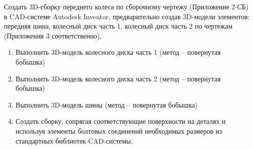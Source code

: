 
Создать 3D-сборку переднего колеса по сборочному чертежу (Приложение 2-СБ) в CAD-системе Autodesk Inventor, предварительно создав 3D-модели элементов: передняя шина, колесный диск часть 1, колесный диск часть 2 по чертежам (Приложения 3 соответственно).



\explaneSection

\begin{enumerate}
    \item Выполнить 3D-модель колесного диска часть 1 (метод – повернутая бобышка)
    \item Выполнить 3D-модель колесного диска часть 2 (метод – повернутая бобышка)
    \item Выполнить 3D-модель шины (метод – повернутая бобышка)
    \item Создать сборку, сопрягая соответствующие поверхности на деталях и используя элементы болтовых соединений необходимых размеров из стандартных библиотек CAD-системы.
\end{enumerate}    